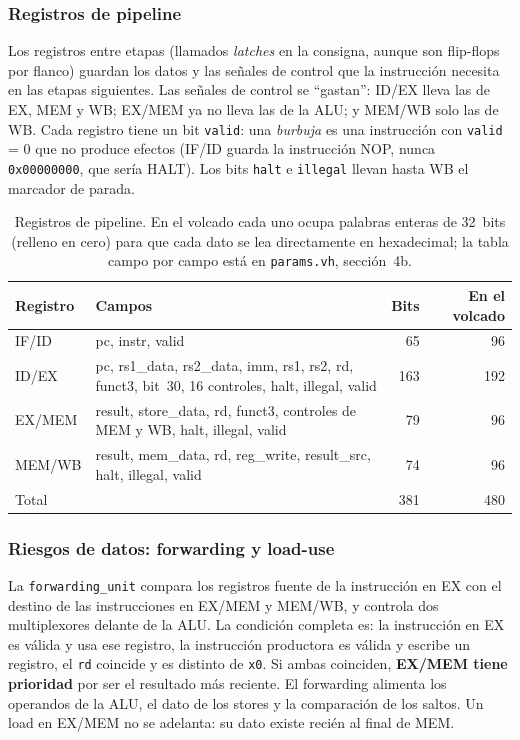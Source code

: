 \documentclass[12pt,a4paper]{article}
\begin{document}
\subsubsection{Registros de pipeline}

Los registros entre etapas (llamados \emph{latches} en la consigna, aunque son
flip-flops por flanco) guardan los datos y las señales de control que la
instrucción necesita en las etapas siguientes. Las señales de control se
``gastan'': ID/EX lleva las de EX, MEM y WB; EX/MEM ya no lleva las de la ALU; y
MEM/WB solo las de WB. Cada registro tiene un bit \texttt{valid}: una
\emph{burbuja} es una instrucción con \texttt{valid} = 0 que no produce efectos
(IF/ID guarda la instrucción NOP, nunca \texttt{0x00000000}, que sería HALT).
Los bits \texttt{halt} e \texttt{illegal} llevan hasta WB el marcador de
parada.

\begin{table}[H]
\centering
\small
\begin{tabular}{@{}lL{7.4cm}rr@{}}
\toprule
Registro & Campos & Bits & En el volcado \\
\midrule
IF/ID & pc, instr, valid & 65 & 96 \\
ID/EX & pc, rs1\_data, rs2\_data, imm, rs1, rs2, rd, funct3, bit~30, 16 controles, halt, illegal, valid & 163 & 192 \\
EX/MEM & result, store\_data, rd, funct3, controles de MEM y WB, halt, illegal, valid & 79 & 96 \\
MEM/WB & result, mem\_data, rd, reg\_write, result\_src, halt, illegal, valid & 74 & 96 \\
\midrule
Total & & 381 & 480 \\
\bottomrule
\end{tabular}
\caption{Registros de pipeline. En el volcado cada uno ocupa palabras enteras
de 32~bits (relleno en cero) para que cada dato se lea directamente en
hexadecimal; la tabla campo por campo está en \texttt{params.vh}, sección~4b.}
\end{table}

\subsubsection{Riesgos de datos: forwarding y load-use}

La \texttt{forwarding\_unit} compara los registros fuente de la instrucción en
EX con el destino de las instrucciones en EX/MEM y MEM/WB, y controla dos
multiplexores delante de la ALU. La condición completa es: la instrucción en EX
es válida y usa ese registro, la instrucción productora es válida y escribe un
registro, el \texttt{rd} coincide y es distinto de \texttt{x0}. Si ambas
coinciden, \textbf{EX/MEM tiene prioridad} por ser el resultado más reciente. El
forwarding alimenta los operandos de la ALU, el dato de los stores y la
comparación de los saltos. Un load en EX/MEM no se adelanta: su dato existe
recién al final de MEM.
\end{document}

